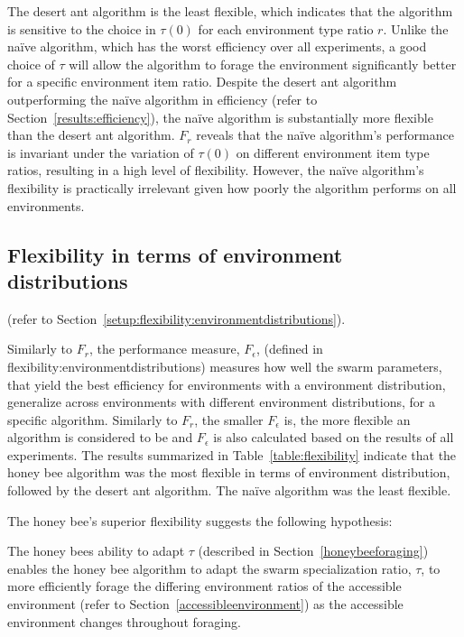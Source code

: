 The desert ant algorithm is the least flexible, which indicates that the algorithm is sensitive to the choice in $\tau(0)$ for each environment type ratio $r$. Unlike the na\"ive algorithm, which has the worst efficiency over all experiments, a good choice of $\tau$ will allow the algorithm to forage the environment significantly better for a specific environment item ratio. Despite the desert ant algorithm outperforming the na\"ive algorithm in efficiency (refer to Section~\ref{results:efficiency}), the na\"ive algorithm is substantially more flexible than the desert ant algorithm. $F_r$ reveals that the na\"ive algorithm's performance is invariant under the variation of $\tau(0)$ on different environment item type ratios, resulting in a high level of flexibility. However, the na\"ive algorithm's flexibility is practically irrelevant given how poorly the algorithm performs on all environments. 


\subsection{Flexibility in terms of environment distributions}
\label{results:flexibility:environmentdistribution}

 (refer to Section~\ref{setup:flexibility:environmentdistributions}).

Similarly to $F_r$, the performance measure, $F_\epsilon$, (defined in flexibility:environmentdistributions) measures how well the swarm parameters, that yield the best efficiency for environments with a environment distribution, generalize across environments with different environment distributions, for a specific algorithm. Similarly to $F_r$, the smaller $F_\epsilon$ is, the more flexible an algorithm is considered to be and $F_\epsilon$ is also calculated based on the results of all experiments. The results summarized in Table~\ref{table:flexibility} indicate that the honey bee algorithm was the most flexible in terms of environment distribution, followed by the desert ant algorithm. The na\"ive algorithm was the least flexible.

The honey bee's superior flexibility suggests the following hypothesis:

The honey bees ability to adapt $\tau$ (described in Section~\ref{honeybeeforaging}) enables the honey bee algorithm to adapt the swarm specialization ratio, $\tau$, to more efficiently forage the differing environment ratios of the accessible environment (refer to Section~\ref{accessibleenvironment}) as the accessible environment changes throughout foraging.

